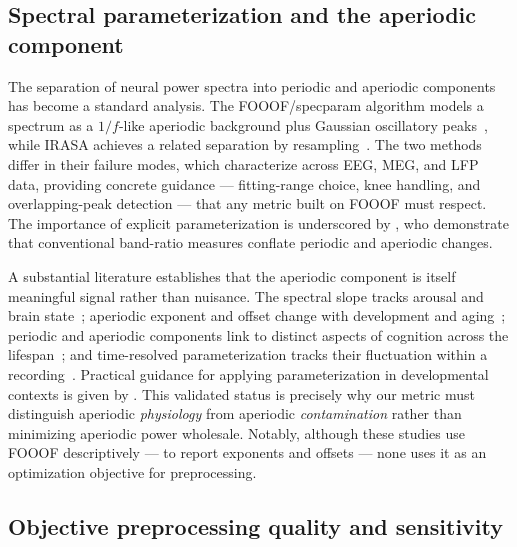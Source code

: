 \subsection{Spectral parameterization and the aperiodic component}
\label{sec:rw_fooof}

The separation of neural power spectra into periodic and aperiodic components has become a standard analysis. The FOOOF/specparam algorithm models a spectrum as a $1/f$-like aperiodic background plus Gaussian oscillatory peaks~\cite{HallerEtAl2018, DonoghueEtAl2020b}, while IRASA achieves a related separation by resampling~\cite{WenLiu2016}. The two methods differ in their failure modes, which \citet{GersterEtAl2022} characterize across EEG, MEG, and LFP data, providing concrete guidance --- fitting-range choice, knee handling, and overlapping-peak detection --- that any metric built on FOOOF must respect. The importance of explicit parameterization is underscored by \citet{DonoghueEtAl2020a}, who demonstrate that conventional band-ratio measures conflate periodic and aperiodic changes.

A substantial literature establishes that the aperiodic component is itself meaningful signal rather than nuisance. The spectral slope tracks arousal and brain state~\cite{LendnerEtAl2020}; aperiodic exponent and offset change with development and aging~\cite{HillEtAl2022, MerkinEtAl2022}; periodic and aperiodic components link to distinct aspects of cognition across the lifespan~\cite{ThuwalEtAl2021}; and time-resolved parameterization tracks their fluctuation within a recording~\cite{WilsonEtAl2022}. Practical guidance for applying parameterization in developmental contexts is given by \citet{OstlundEtAl2022}. This validated status is precisely why our metric must distinguish aperiodic \emph{physiology} from aperiodic \emph{contamination} rather than minimizing aperiodic power wholesale. Notably, although these studies use FOOOF descriptively --- to report exponents and offsets --- none uses it as an optimization objective for preprocessing.

\subsection{Objective preprocessing quality and sensitivity}
\label{sec:rw_quality}

